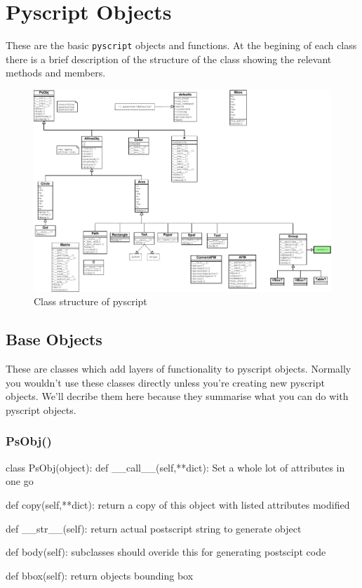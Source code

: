 \documentclass[a4paper]{book}
\begin{document}
\chapter{Pyscript Objects}
\label{cha:base-objects}

These are the basic \Verb|pyscript| objects and functions. At the begining
of each class there is a brief description of the structure of the class
showing the relevant methods and members.

\begin{figure}[h]
  \begin{center}
   \includegraphics{class_structure}
  \end{center}
  \caption{Class structure of pyscript}
  \label{fig:classes}
\end{figure}

\section{Base Objects}

These are classes which add layers of functionality to pyscript objects.
Normally you wouldn't use these classes directly unless you're creating new 
pyscript objects. We'll decribe them here because they summarise what
you can do with pyscript objects.

\subsection{PsObj()}
\label{sec:psobj}
\begin{python}
class PsObj(object):
    def __call__(self,**dict):
        Set a whole lot of attributes in one go

    def copy(self,**dict):
        return a copy of this object
        with listed attributes modified

    def __str__(self):
        return actual postscript string to generate object

    def body(self):
        subclasses should overide this for generating postscipt code

    def bbox(self):
        return objects bounding box
\end{python}
\end{document}
